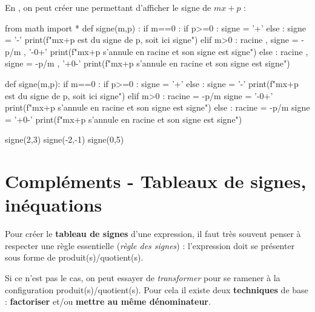 \documentclass[a4paper,11pt]{article}
\begin{document}
\begin{calgo}
En \calgpython, on peut créer une  permettant d'afficher le signe de $mx+p$ :

\begin{tcpythoncode}[15cm]
	\begin{pyverbatim}[][fontsize=\footnotesize,numbers=left,numbersep=10pt]
		from math import *
		def signe(m,p) :
			if m==0 :
				if p>=0 :
					signe = '+'
				else :
					signe = '-'
				print(f"mx+p est du signe de p, soit ici {signe}")
			elif m>0 :
				racine , signe = -p/m , '-0+'
				print(f"mx+p s'annule en {racine} et son signe est {signe}")
			else :
				racine , signe = -p/m , '+0-'
				print(f"mx+p s'annule en {racine} et son signe est {signe}")
	\end{pyverbatim}
\end{tcpythoncode}

\begin{pyconcode}
def signe(m,p):
	if m==0 :
		if p>=0 :
			signe = '+'
		else :
			signe = '-'
		print(f"mx+p est du signe de p, soit ici {signe}")
	elif m>0 :
		racine = -p/m
		signe = '-0+'
		print(f"mx+p s'annule en {racine} et son signe est {signe}")
	else :
		racine = -p/m
		signe = '+0-'
		print(f"mx+p s'annule en {racine} et son signe est {signe}")
	
	
\end{pyconcode}

\begin{consolepython}[15cm]
\begin{pyconsole}[][framesep=3mm,frame=single,label={[\scriptsize Début de la console \logopython]\scriptsize Fin de la console \logopython},fontsize=\footnotesize,framerule=1pt,rulecolor=\color{ForestGreen}]
signe(2,3)
signe(-2,-1)
signe(0,5)
\end{pyconsole}
\end{consolepython}
\end{calgo}

\section{Compléments - Tableaux de signes, inéquations}

\begin{crappel}[s]
Pour créer le \textbf{tableau de signes} d'une expression, il faut très souvent penser à respecter une règle essentielle (\textit{règle des signes}) : l'expression doit se présenter sous forme de produit(s)/quotient(s).

\smallskip

Si ce n'est pas le cas, on peut essayer de \textit{transformer} pour se ramener à la configuration produit(s)/quotient(s). Pour cela il existe deux \textbf{techniques} de base : \textbf{factoriser} et/ou \textbf{mettre au même dénominateur}.
\end{crappel}
\end{document}
